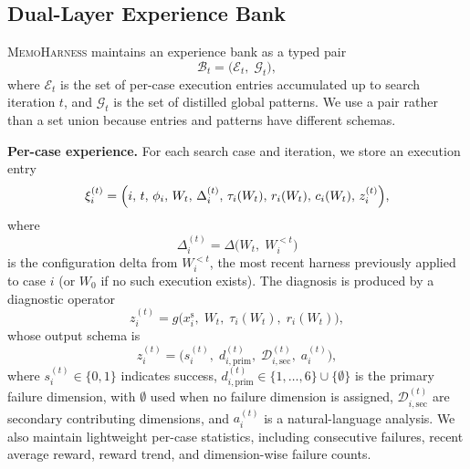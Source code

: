 \documentclass{article}
\newcommand{\method}{\textsc{MemoHarness}\xspace}
\newcommand{\methodlabel}[1]{\noindent\textbf{\textcolor{narrareddeep}{#1}}}
\begin{document}
\subsection{Dual-Layer Experience Bank}
\label{sec:experience_bank}

\method maintains an experience bank as a typed pair
\begin{equation}
\label{eq:bank}
\mathcal{B}_t
=
\bigl(\mathcal{E}_t,\; \mathcal{G}_t\bigr),
\end{equation}
where $\mathcal{E}_t$ is the set of per-case execution entries accumulated up
to search iteration $t$, and $\mathcal{G}_t$ is the set of distilled global
patterns. We use a pair rather than a set union because entries and patterns
have different schemas.

\methodlabel{Per-case experience.}
For each search case and iteration, we store an execution entry
\begin{equation}
\label{eq:per_case}
\xi_i^{(t)} =
\Bigl(
i,\,
t,\,
\phi_i,\,
W_t,\,
\Delta_i^{(t)},\,
\tau_i(W_t),\,
r_i(W_t),\,
c_i(W_t),\,
z_i^{(t)}
\Bigr),
\end{equation}
where
\begin{equation}
\label{eq:delta}
\Delta_i^{(t)}
=
\Delta\!\bigl(W_t,\; W_i^{<t}\bigr)
\end{equation}
is the configuration delta from $W_i^{<t}$, the most recent harness previously
applied to case $i$ (or $W_0$ if no such execution exists). The diagnosis is
produced by a diagnostic operator
\begin{equation}
\label{eq:diagnostic_operator}
z_i^{(t)}
=
g\!\bigl(x_i^{\mathrm{s}},\; W_t,\; \tau_i(W_t),\; r_i(W_t)\bigr),
\end{equation}
whose output schema is
\begin{equation}
\label{eq:diagnosis}
z_i^{(t)} =
\bigl(
s_i^{(t)},\;
d_{i,\text{prim}}^{(t)},\;
\mathcal{D}_{i,\text{sec}}^{(t)},\;
a_i^{(t)}
\bigr),
\end{equation}
where $s_i^{(t)} \in \{0,1\}$ indicates success,
$d_{i,\text{prim}}^{(t)} \in \{1,\ldots,6\}\cup\{\emptyset\}$ is the primary
failure dimension, with $\emptyset$ used when no failure dimension is assigned,
$\mathcal{D}_{i,\text{sec}}^{(t)}$ are secondary contributing dimensions, and
$a_i^{(t)}$ is a natural-language analysis. We also maintain lightweight
per-case statistics, including consecutive failures, recent average reward,
reward trend, and dimension-wise failure counts.
\end{document}
